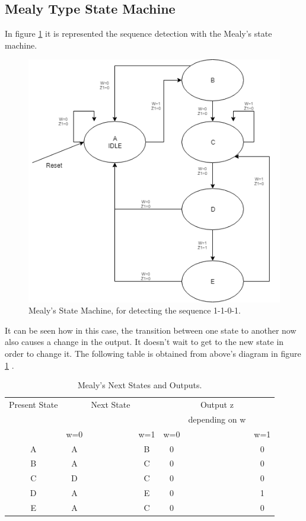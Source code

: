 \subsection{\color{purple}Mealy Type State Machine}

In figure \ref {MealyEFSM} it is represented the sequence detection with the Mealy's state machine.

\begin{figure}[H]
\centering
\includegraphics[scale=0.5]{../Exercise2/EJ2MEALY}
\caption{\color{cyan}Mealy's State Machine, for detecting the sequence 1-1-0-1.}
\label{MealyEFSM}
\end{figure}

It can be seen how in this case, the transition between one state to another now also causes a change in the output. It doesn't wait to get to the new state in order to change it. The following table is obtained from above's diagram in figure \ref {measej2} .
\begin{table}[H]
\begin{center}
\begin{tabular}{|c|c c c|c c c|}
\hline
Present State & & Next State & & & Output z & \\
 &  & & & & depending on w&  \\
 & w=0 & & w=1 & w=0& &w=1  \\
\hline
\hline
A & A & & B & 0 & & 0   \\
\hline
B & A & & C & 0 & & 0   \\
\hline
C & D & & C & 0 & & 0 \\
\hline
D & A & & E & 0 & & 1  \\
\hline
E & A & & C & 0 & & 0 \\
\hline
\hline
\end{tabular}
\end{center}
\caption{\label{measej2}\color{cyan}Mealy's Next States and Outputs.}
\end{table}


